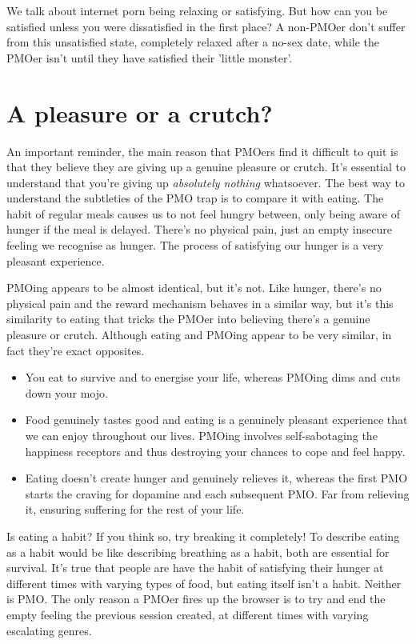 \documentclass[easypeasy.tex]{subfiles}
\begin{document}
We talk about internet porn being relaxing or satisfying. But how can you be satisfied unless you were dissatisfied in the first place? A non-PMOer don't suffer from this unsatisfied state, completely relaxed after a no-sex date, while the PMOer isn't until they have satisfied their 'little monster'.

\section{A pleasure or a crutch?}
An important reminder, the main reason that PMOers find it difficult to quit is that they believe they are giving up a genuine pleasure or crutch. It's essential to understand that you're giving up \textit{absolutely nothing} whatsoever. The best way to understand the subtleties of the PMO trap is to compare it with eating. The habit of regular meals causes us to not feel hungry between, only being aware of hunger if the meal is delayed. There's no physical pain, just an empty insecure feeling we recognise as hunger. The process of satisfying our hunger is a very pleasant experience.

PMOing appears to be almost identical, but it's not. Like hunger, there's no physical pain and the reward mechanism behaves in a similar way, but it's this similarity to eating that tricks the PMOer into believing there's a genuine pleasure or crutch. Although eating and PMOing appear to be very similar, in fact they're exact opposites.

\begin{itemize}
  \item You eat to survive and to energise your life, whereas PMOing dims and cuts down your mojo.
  \item Food genuinely tastes good and eating is a genuinely pleasant experience that we can enjoy throughout our lives. PMOing involves self-sabotaging the happiness receptors and thus destroying your chances to cope and feel happy.
  \item Eating doesn't create hunger and genuinely relieves it, whereas the first PMO starts the craving for dopamine and each subsequent PMO. Far from relieving it, ensuring suffering for the rest of your life.
  \end{itemize}

Is eating a habit? If you think so, try breaking it completely! To describe eating as a habit would be like describing breathing as a habit, both are essential for survival. It's true that people are have the habit of satisfying their hunger at different times with varying types of food, but eating itself isn't a habit. Neither is PMO. The only reason a PMOer fires up the browser is to try and end the empty feeling the previous session created, at different times with varying escalating genres.
\end{document}
